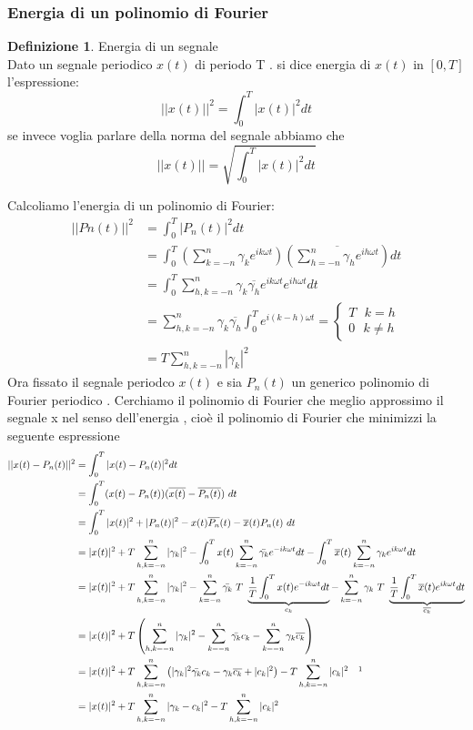 \documentclass{article}
\theoremstyle{definition}
\newtheorem*{definizione}{Definizione}
\newcommand{\inT}{\int_{0}^{T} }
\begin{document}
\subsubsection{Energia di un polinomio di Fourier}

\begin{definizione}
	Energia di un segnale \\
Dato un segnale periodico $x(t)$ di periodo T . si dice energia di $x(t)$ in $[0,T]$ l'espressione:
$$||x(t)||^2=\int_{0}^{T}|x(t)|^2dt$$ 
se invece voglia parlare della norma del segnale abbiamo che 
$$||x(t)||=\sqrt{\int_{0}^{T}|x(t)|^2dt}$$
\end{definizione}
Calcoliamo l'energia di un polinomio di Fourier:
\begin{align*}
||Pn(t)||^2&=\int_0^T |P_n(t)|^2dt\\
&=\int_{0}^{T}\left(\sum_{k=-n}^n \gamma_ke^{ik\omega t}\right )\left(\overline{\sum_{h=-n}^n \gamma_he^{ih\omega t}} \right) dt\\
&=\int_{0}^{T} \sum_{h,k=-n}^n \gamma_{k} \overline{\gamma_h} e^{ik\omega t}e^{ih\omega t} dt\\
&= \sum_{h,k=-n}^n \gamma_{k} \overline{\gamma_h}\int_{0}^{T}e^{i(k-h)\omega t}=\begin{cases}
	T \ \ \ k=h\\
	0 \ \ \ k\neq h 
\end{cases} \\
&=T\sum_{h,k=-n}^n |\gamma_{k}|^2 
\end{align*}
Ora fissato il segnale periodco $x(t)$ e sia $P_n(t)$ un generico polinomio di Fourier periodico . Cerchiamo il polinomio di Fourier che meglio approssimo il segnale x nel senso dell'energia , cioè il polinomio di Fourier che minimizzi la seguente espressione 
\begin{align*}
	||x(t)-P_n(t)||^2&= \int_{0}^{T}  |x(t)-P_n(t)|^2 dt \\ 
	&=\int_{0}^{T} (x(t)-P_n(t))(\overline{x(t)}-\overline{P_n(t)})\ dt\\
	&= \int_{0}^{T} |x (t)|^2+|P_n(t)|^2 - x(t)\overline{P_n}(t)-\overline{x}(t)P_n(t)\ dt\\
	&= |x (t)|^2 +T\sum_{h,k=-n}^n |\gamma_{k}|^2  - \inT x(t) \sum_{k=-n}^n \bar{\gamma_k}e^{-ik\omega t}dt  - \inT \overline{x}(t)\sum_{k=-n}^n \gamma_ke^{ik\omega t}dt\\
	&=  |x (t)|^2 +T\sum_{h,k=-n}^n |\gamma_{k}|^2 - \sum_{k=-n}^n \bar{\gamma_k} \ T \ \underbrace{\frac{1}{T}\inT x(t) e^{-ik\omega t}dt}_{c_k} -\sum_{k=-n}^n \gamma_k \ T \ \underbrace{\frac{1}{T}\inT \overline{x}(t)e^{ik\omega t}dt}_{\overline{c_k}}\\
	&= |x (t)|^2 +T\left(\sum_{h,k=-n}^n |\gamma_{k}|^2 -\sum_{k=-n}^n \bar{\gamma_k}  c_k- \sum_{k=-n}^n \gamma_k \overline{c_k}\right)\\
	&= |x (t)|^2 +T\sum_{h,k=-n}^n \left( |\gamma_{k}|^2 \bar{\gamma_k}  c_k-\gamma_k \overline{c_k} +|c_k|^2\right) - T \sum_{h,k=-n}^n |c_k|^2 \ \ \ \footnotemark
\\
&=|x (t)|^2 +T\sum_{h,k=-n}^n |\gamma_k-c_k|^2 - T \sum_{h,k=-n}^n |c_k|^2 
			\end{align*}
\end{document}
